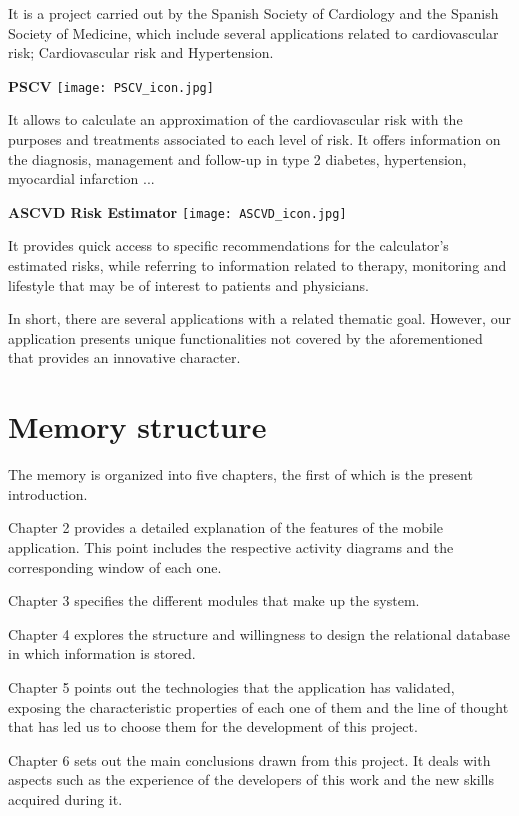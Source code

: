 \documentclass[11pt,spanish,
		listoftables,listoffigures]
		{tfgplantilla}
\begin{document}
\noindent
It is a project carried out by the Spanish Society of Cardiology and the Spanish Society of Medicine, which include several applications related to cardiovascular risk; Cardiovascular risk and Hypertension.

\noindent
\textbf {PSCV}
\texttt{[image: PSCV\_icon.jpg]}

\noindent
It allows to calculate an approximation of the cardiovascular risk with the purposes and treatments associated to each level of risk. It offers information on the diagnosis, management and follow-up in type 2 diabetes, hypertension, myocardial infarction ...

\newpage
\noindent
\textbf {ASCVD Risk Estimator}
\texttt{[image: ASCVD\_icon.jpg]}

\noindent
It provides quick access to specific recommendations for the calculator's estimated risks, while referring to information related to therapy, monitoring and lifestyle that may be of interest to patients and physicians.

In short, there are several applications with a related thematic goal. However, our application presents unique functionalities not covered by the aforementioned that provides an innovative character. 

\section{Memory structure}

The memory is organized into five chapters, the first of which is the present introduction.

Chapter 2 provides a detailed explanation of the features of the mobile application. This point includes the respective activity diagrams and the corresponding window of each one.

Chapter 3 specifies the different modules that make up the system.

Chapter 4 explores the structure and willingness to design the relational database in which information is stored.

Chapter 5 points out the technologies that the application has validated, exposing the characteristic properties of each one of them and the line of thought that has led us to choose them for the development of this project.

Chapter 6 sets out the main conclusions drawn from this project. It deals with aspects such as the experience of the developers of this work and the new skills acquired during it.
\end{document}
